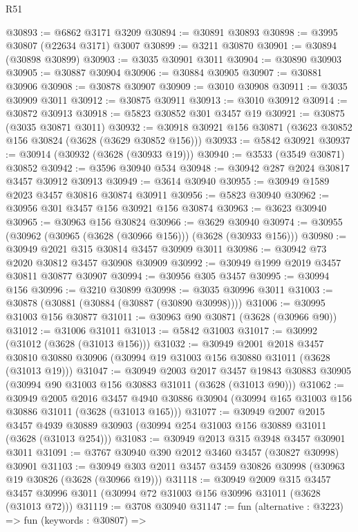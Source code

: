 \begin{lexlean}{R51}
\begin{coremodule}
@30893 := @6862 @3171 @3209
@30894 := @30891 @30893
@30898 := @3995 @30807 (@22634 @3171) @3007
@30899 := @3211 @30870
@30901 := @30894 (@30898 @30899)
@30903 := @3035 @30901 @3011
@30904 := @30890 @30903
@30905 := @30887 @30904
@30906 := @30884 @30905
@30907 := @30881 @30906
@30908 := @30878 @30907
@30909 := @3010 @30908
@30911 := @3035 @30909 @3011
@30912 := @30875 @30911
@30913 := @3010 @30912
@30914 := @30872 @30913
@30918 := @5823 @30852 @301 @3457 @19
@30921 := @30875 (@3035 @30871 @3011)
@30932 := @30918 @30921 @156 @30871 (@3623 @30852 @156 @30824 (@3628 (@3629 @30852 @156)))
@30933 := @5842 @30921
@30937 := @30914 (@30932 (@3628 (@30933 @19)))
@30940 := @3533 (@3549 @30871) @30852
@30942 := @3596 @30940 @534
@30948 := @30942 @287 @2024 @30817 @3457 @30912 @30913
@30949 := @3614 @30940
@30955 := @30949 @1589 @2023 @3457 @30816 @30874 @30911
@30956 := @5823 @30940
@30962 := @30956 @301 @3457 @156 @30921 @156 @30874
@30963 := @3623 @30940
@30965 := @30963 @156 @30824
@30966 := @3629 @30940
@30974 := @30955 (@30962 (@30965 (@3628 (@30966 @156))) (@3628 (@30933 @156)))
@30980 := @30949 @2021 @315 @30814 @3457 @30909 @3011
@30986 := @30942 @73 @2020 @30812 @3457 @30908 @30909
@30992 := @30949 @1999 @2019 @3457 @30811 @30877 @30907
@30994 := @30956 @305 @3457
@30995 := @30994 @156
@30996 := @3210 @30899
@30998 := @3035 @30996 @3011
@31003 := @30878 (@30881 (@30884 (@30887 (@30890 @30998))))
@31006 := @30995 @31003 @156 @30877
@31011 := @30963 @90 @30871 (@3628 (@30966 @90))
@31012 := @31006 @31011
@31013 := @5842 @31003
@31017 := @30992 (@31012 (@3628 (@31013 @156)))
@31032 := @30949
    @2001
    @2018
    @3457
    @30810
    @30880
    @30906
    (@30994 @19 @31003 @156 @30880 @31011 (@3628 (@31013 @19)))
@31047 := @30949
    @2003
    @2017
    @3457
    @19843
    @30883
    @30905
    (@30994 @90 @31003 @156 @30883 @31011 (@3628 (@31013 @90)))
@31062 := @30949
    @2005
    @2016
    @3457
    @4940
    @30886
    @30904
    (@30994 @165 @31003 @156 @30886 @31011 (@3628 (@31013 @165)))
@31077 := @30949
    @2007
    @2015
    @3457
    @4939
    @30889
    @30903
    (@30994 @254 @31003 @156 @30889 @31011 (@3628 (@31013 @254)))
@31083 := @30949 @2013 @315 @3948 @3457 @30901 @3011
@31091 := @3767 @30940 @390 @2012 @3460 @3457 (@30827 @30998) @30901
@31103 := @30949 @303 @2011 @3457 @3459 @30826 @30998 (@30963 @19 @30826 (@3628 (@30966 @19)))
@31118 := @30949
    @2009
    @315
    @3457
    @3457
    @30996
    @3011
    (@30994 @72 @31003 @156 @30996 @31011 (@3628 (@31013 @72)))
@31119 := @3708 @30940
@31147 := fun (alternative : @3223) =>
  fun (keywords : @30807) =>

\end{coremodule}
\end{lexlean}
